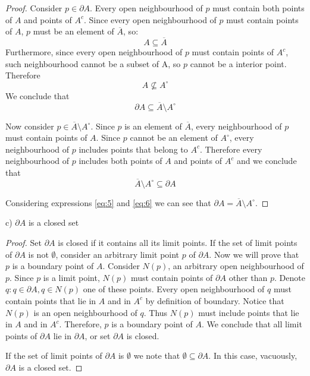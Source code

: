 \documentclass{article}
\begin{document}
\begin{proof}
Consider $p \in \partial A$. Every open neighbourhood of $p$ must contain both points of $A$ and points of $A^c$. Since every open neighbourhood of $p$ must contain points of $A$, $p$ must be an element of $\overline{A}$, so:
$$ A \subseteq \overline{A} $$
Furthermore, since every open neighbourhood of $p$ must contain points of $A^c$, such neighbourhood cannot be a subset of A, so $p$ cannot be a interior point. Therefore
$$ A \nsubseteq A^\circ $$
We conclude that
\begin{equation} \label{eq:5}
\partial A \subseteq \overline{A} \setminus A^\circ
\end{equation}

Now consider $p \in \overline{A} \setminus A^\circ$. Since $p$ is an element of $\overline{A}$, every neighbourhood of $p$ must contain points of $A$. Since $p$ cannot be an element of $A^\circ$, every neighbourhood of $p$ includes points that belong to $A^c$. Therefore every neighbourhood of $p$ includes both points of $A$ and points of $A^c$ and we conclude that
\begin{equation} \label{eq:6}
\overline{A} \setminus A^\circ \subseteq \partial A
\end{equation}

Considering expressions \ref{eq:5} and \ref{eq:6} we can see that $\partial A = \overline{A} \setminus A^\circ$. 
\end{proof}

\begin{tcolorbox}
c) $\partial A$ is a closed set
\end{tcolorbox}

\begin{proof}
Set $\partial A$ is closed if it contains all its limit points. If the set of limit points of $\partial A$ is not $\emptyset$, consider an arbitrary limit point $p$ of $\partial A$. Now we will prove that $p$ is a boundary point of $A$. Consider $N(p)$, an arbitrary open neighbourhood of $p$. Since $p$ is a limit point, $N(p)$ must contain points of $\partial A$ other than $p$. Denote $q : q \in \partial A, q \in N(p)$ one of these points. Every open neighbourhood of $q$ must contain points that lie in $A$ and in $A^c$ by definition of boundary. Notice that $N(p)$ is an open neighbourhood of $q$. Thus $N(p)$ must include points that lie in $A$ and in $A^c$. Therefore, $p$ is a boundary point of $A$. We conclude that all limit points of $\partial A$ lie in $\partial A$, or set $\partial A$ is closed. 

If the set of limit points of $\partial A$ is $\emptyset$ we note that $\emptyset \subseteq \partial A$. In this case, vacuously, $\partial A$ is a closed set.
\end{proof}
\end{document}
